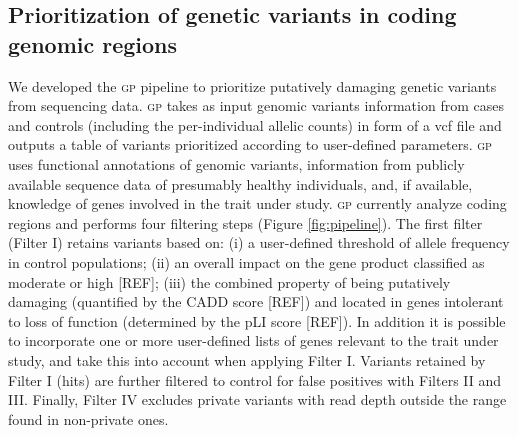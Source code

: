 \documentclass[fleqn,10pt]{wlscirep}
\newcommand{\gp}[]{\textsc{gp }}
\begin{document}
\subsection*{Prioritization of genetic variants in coding genomic regions} 
We developed the \gp pipeline to prioritize putatively damaging genetic variants from sequencing data. \gp takes as input genomic variants information from cases and controls (including the per-individual allelic counts) in form of a vcf file and outputs a table of variants prioritized according to user-defined parameters. \gp uses functional annotations of genomic variants, information from publicly available sequence data of presumably healthy individuals, and, if available, knowledge of genes involved in the trait under study. \gp currently analyze coding regions and performs four filtering steps (Figure \ref{fig:pipeline}). The first filter (Filter I) retains variants based on: (i) a user-defined threshold of allele frequency in control populations; (ii) an overall impact on the gene product classified as moderate or high [REF]; (iii) the combined property of being putatively damaging (quantified by the CADD score [REF]) and located in genes intolerant to loss of function (determined by the pLI score [REF]). In addition it is possible to incorporate one or more user-defined lists of genes relevant to the trait under study, and take this into account when applying Filter I. Variants retained by Filter I (hits) are further filtered to control for false positives with Filters II and III. Finally, Filter IV excludes private variants with read depth outside the range found in non-private ones.   

\end{document}
